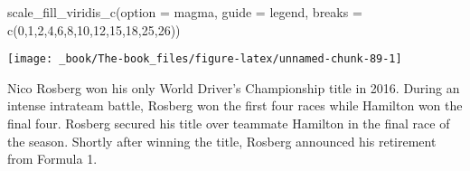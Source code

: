 \documentclass[
]{book}
\newenvironment{Shaded}{\begin{snugshade}}{\end{snugshade}}
\newcommand{\AttributeTok}[1]{\textcolor[rgb]{0.77,0.63,0.00}{#1}}
\newcommand{\DecValTok}[1]{\textcolor[rgb]{0.00,0.00,0.81}{#1}}
\newcommand{\FunctionTok}[1]{\textcolor[rgb]{0.00,0.00,0.00}{#1}}
\newcommand{\NormalTok}[1]{#1}
\newcommand{\StringTok}[1]{\textcolor[rgb]{0.31,0.60,0.02}{#1}}
\begin{document}
\begin{Shaded}
\begin{Highlighting}[]
  \FunctionTok{scale\_fill\_viridis\_c}\NormalTok{(}\AttributeTok{option =} \StringTok{\textquotesingle{}magma\textquotesingle{}}\NormalTok{,}
                       \AttributeTok{guide =} \StringTok{\textquotesingle{}legend\textquotesingle{}}\NormalTok{,}
                       \AttributeTok{breaks =} \FunctionTok{c}\NormalTok{(}\DecValTok{0}\NormalTok{,}\DecValTok{1}\NormalTok{,}\DecValTok{2}\NormalTok{,}\DecValTok{4}\NormalTok{,}\DecValTok{6}\NormalTok{,}\DecValTok{8}\NormalTok{,}\DecValTok{10}\NormalTok{,}\DecValTok{12}\NormalTok{,}\DecValTok{15}\NormalTok{,}\DecValTok{18}\NormalTok{,}\DecValTok{25}\NormalTok{,}\DecValTok{26}\NormalTok{))}
\end{Highlighting}
\end{Shaded}

\begin{center}\texttt{[image: \_book/The-book\_files/figure-latex/unnamed-chunk-89-1]} \end{center}

Nico Rosberg won his only World Driver's Championship title in 2016. During an intense intrateam battle, Rosberg won the first four races while Hamilton won the final four. Rosberg secured his title over teammate Hamilton in the final race of the season. Shortly after winning the title, Rosberg announced his retirement from Formula 1.
\end{document}
